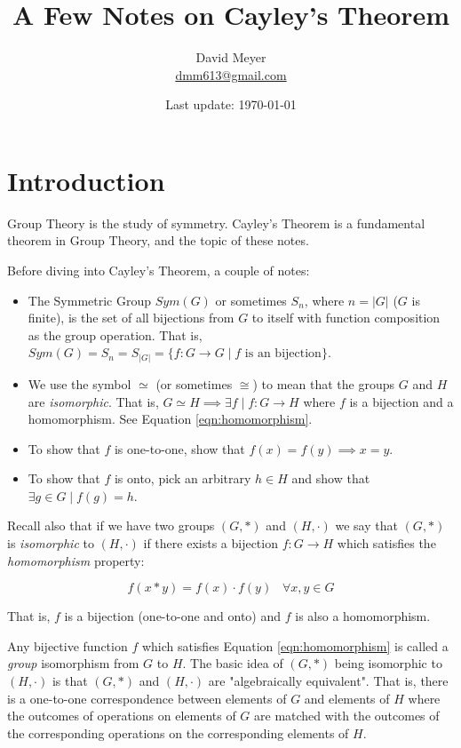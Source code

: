 \documentclass{article}
\title{A Few Notes on Cayley’s Theorem}
\author{David Meyer \\ \href{mailto:dmm613@gmail.com}
                            {dmm613@gmail.com}}
\date{Last update: \today}
\theoremstyle{definition}
\begin{document}
\maketitle
%
%
%
\section{Introduction}
Group Theory is the study of symmetry.  Cayley's Theorem is a fundamental theorem in Group Theory, and the topic of these notes.

\bigskip
\noindent
Before diving into Cayley's Theorem, a couple of notes:
\begin{itemize}
\item The Symmetric Group $Sym(G)$ or sometimes $S_n$, where $n = |G|$ ($G$ is finite), is the set of all bijections from $G$ to itself with function composition as 
the group operation.  That is, $Sym(G) = S_n = S_{|G|} = \{f: G \rightarrow G \mid f \text{ is an bijection}\}$.
\item We use the symbol $\simeq$ (or sometimes $\cong$) to mean that the groups $G$ and $H$ are \emph{isomorphic}. That is, 
$G \simeq H \implies \exists f \mid f: G \rightarrow H$ where $f$ is a bijection and a homomorphism. See Equation \ref{eqn:homomorphism}.
 \item To show that $f$ is one-to-one, show that $f(x) = f(y) \implies x = y$.
 \item To show that $f$ is onto, pick an arbitrary $h \in H$ and show that $\exists g \in G \mid f(g) = h$.
\end{itemize}

\bigskip
\noindent
Recall also that if we have two groups $(G,*)$ and $(H,\cdot)$ we say that $(G,*)$  is \emph{isomorphic} to $(H,\cdot)$ if there exists a bijection $f:G \rightarrow H$
which satisfies the \emph{homomorphism} property:

\bigskip
\begin{equation}
f(x * y) = f(x) \cdot f(y) \;\;\; \forall  x,y \in G
\label{eqn:homomorphism}
\end{equation}

\bigskip
\noindent
That is, $f$ is a bijection (one-to-one and onto) and $f$ is also a homomorphism.


\bigskip
\noindent
Any bijective function $f$ which satisfies Equation \ref{eqn:homomorphism} is called a \emph{group} isomorphism from $G$ to $H$. The basic idea of
$(G,*)$ being isomorphic to $(H,\cdot)$ is that $(G,*)$ and $(H,\cdot)$ are "algebraically equivalent". That is, there is a one-to-one correspondence 
between elements of $G$ and elements of $H$ where the outcomes of operations on elements of $G$ are matched with the outcomes of the 
corresponding operations on the corresponding elements of $H$. 
\end{document}
